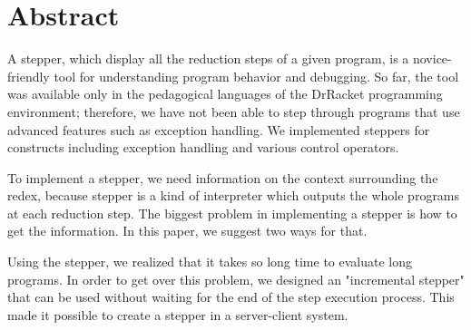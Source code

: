 \chapter*{Abstract}

A stepper, which display all the reduction steps of a given program,
is a novice-friendly tool for understanding program behavior and debugging.
So far, the tool was available only in
the pedagogical languages of the DrRacket programming environment;
therefore, we have not been able to step through programs that use advanced features
such as exception handling.
We implemented steppers for constructs including exception handling and
various control operators.

To implement a stepper, we need information on the context surrounding the redex,
because stepper is a kind of interpreter which outputs
the whole programs at each reduction step.
The biggest problem in implementing a stepper
is how to get the information.
In this paper, we suggest two ways for that.

Using the stepper,
we realized that it takes so long time to evaluate long programs.
In order to get over this problem,
we designed an "incremental stepper" that can be used
without waiting for the end of the step execution process.
This made it possible to create a stepper in a server-client system.

